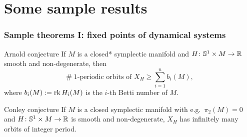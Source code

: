 \section{Some sample results}

\begin{frame}
  \frametitle{Sample theorems I: fixed points of dynamical systems}
  \begin{block}{Arnold conjecture}
    If $M$ is a closed* symplectic manifold and $H\colon\mathbb{S}^{1}\times M\to \mathbb{R}$ smooth and non-degenerate, then
    \vspace{-0.5\baselineskip}
    \[ \#\; \text{$1$-periodic orbits of $X_H$} \geq \sum_{i=1}^n b_i(M),\]
    where $b_i(M) := \operatorname{rk}{H_i(M)}$ is the $i$-th Betti number of $M$.
  \end{block}

  \begin{block}{Conley conjecture}
    If $M$ is a closed symplectic manifold with e.g.\ $\pi_2(M)=0$ and $H\colon \mathbb{S}^{1}\times M\to\mathbb{R}$ is smooth and non-degenerate,
    $X_H$ has infinitely many  orbits of integer period.
  \end{block}
\end{frame}

